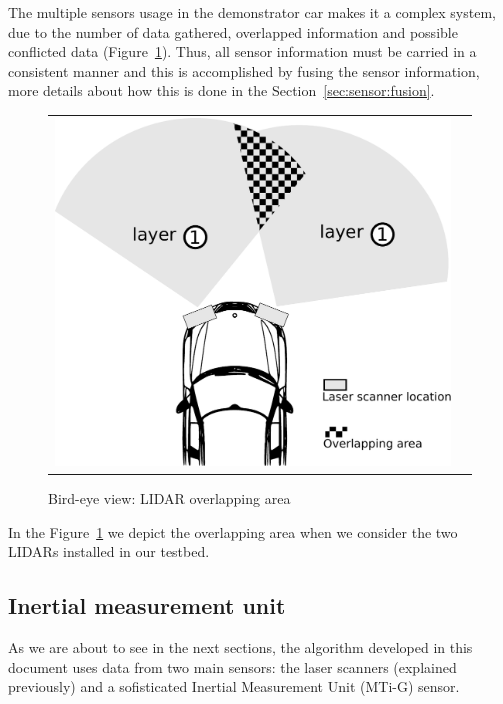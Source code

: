 The multiple sensors usage in the demonstrator car makes it a complex system, due to the number of data gathered, overlapped information and possible conflicted data (Figure~\ref{fig:demonstrator:superior:overlap}). Thus, all sensor information must be carried in a consistent manner and this is accomplished by fusing the sensor information, more details about how this is done in the Section~\ref{sec:sensor:fusion}.

\begin{figure}[h]
   \centering
     \begin{tabular}{lr}
       \includegraphics[scale=0.5]{img/fig:demonstrator:superior:overlap}
     \end{tabular}
   \caption{Bird-eye view: LIDAR overlapping area}
   \label{fig:demonstrator:superior:overlap}
\end{figure}

In the Figure~\ref{fig:demonstrator:superior:overlap} we depict the overlapping area when we consider the two LIDARs installed in our testbed.

\subsection{Inertial measurement unit}

As we are about to see in the next sections, the algorithm developed in this document uses data from two main sensors: the laser scanners (explained previously) and a sofisticated Inertial Measurement Unit (MTi-G) sensor.

